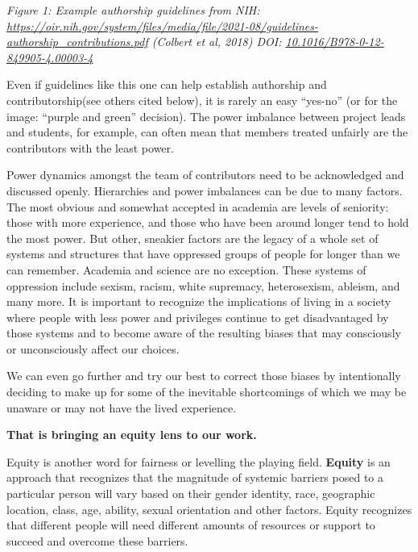 \documentclass[
  letterpaper,
  DIV=11,
  numbers=noendperiod]{scrreport}
\begin{document}
\emph{Figure 1: Example authorship guidelines from NIH:
\url{https://oir.nih.gov/system/files/media/file/2021-08/guidelines-authorship_contributions.pdf}
(Colbert et al, 2018) DOI:
\href{https://doi.org/10.1016/B978-0-12-849905-4.00003-4}{10.1016/B978-0-12-849905-4.00003-4}}

Even if guidelines like this one can help establish authorship and
contributorship(see others cited below), it is rarely an easy ``yes-no''
(or for the image: ``purple and green'' decision). The power imbalance
between project leads and students, for example, can often mean that
members treated unfairly are the contributors with the least power.

Power dynamics amongst the team of contributors need to be acknowledged
and discussed openly. Hierarchies and power imbalances can be due to
many factors. The most obvious and somewhat accepted in academia are
levels of seniority: those with more experience, and those who have been
around longer tend to hold the most power. But other, sneakier factors
are the legacy of a whole set of systems and structures that have
oppressed groups of people for longer than we can remember. Academia and
science are no exception. These systems of oppression include sexism,
racism, white supremacy, heterosexism, ableism, and many more. It is
important to recognize the implications of living in a society where
people with less power and privileges continue to get disadvantaged by
those systems and to become aware of the resulting biases that may
consciously or unconsciously affect our choices.

We can even go further and try our best to correct those biases by
intentionally deciding to make up for some of the inevitable
shortcomings of which we may be unaware or may not have the lived
experience.

\textbf{That is bringing an equity lens to our work.}

Equity is another word for fairness or levelling the playing field.
\textbf{Equity} is an approach that recognizes that the magnitude of
systemic barriers posed to a particular person will vary based on their
gender identity, race, geographic location, class, age, ability, sexual
orientation and other factors. Equity recognizes that different people
will need different amounts of resources or support to succeed and
overcome these barriers.
\end{document}
